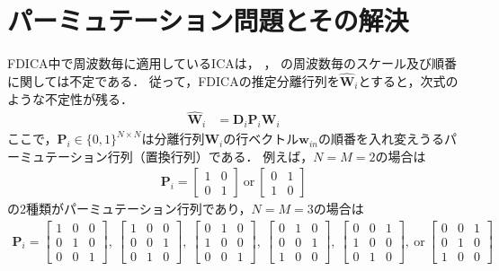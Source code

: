 \section{パーミュテーション問題とその解決}
\label{sec:pp}
FDICA中で周波数毎に適用しているICAは，
，
の周波数毎のスケール及び順番に関しては不定である．
従って，FDICAの推定分離行列を$\hat{\bm{W}}_i$とすると，次式のような不定性が残る．
\begin{align}
	\hat{\bm{W}}_{i} &= \bm{D}_{i}\bm{P}_{i}  \bm{W}_{i} \label{eq:w_fdica}
\end{align}
ここで，$\bm{P}_i \in \{0, 1\}^{N \times N}$は分離行列$\bm{W}_{i}$の行ベクトル$\bm{w}_{in}$の順番を入れ変えうるパーミュテーション行列（置換行列）である．
例えば，$N=M=2$の場合は
\begin{align}
    \bm{P}_i = 
    \begin{bmatrix}
        1 & 0 \\
        0 & 1
    \end{bmatrix}
    ~\mathrm{or}~
    \begin{bmatrix}
        0 & 1 \\
        1 & 0
    \end{bmatrix}
    \label{eq:permu_mat_2dim}
\end{align}
の2種類がパーミュテーション行列であり，$N=M=3$の場合は
\begin{align}
    \bm{P}_i = 
    \begin{bmatrix}
        1 & 0 & 0 \\
        0 & 1 & 0 \\
        0 & 0 & 1
    \end{bmatrix}
    ,~
    \begin{bmatrix}
        1 & 0 & 0 \\
        0 & 0 & 1 \\
        0 & 1 & 0
    \end{bmatrix}
    ,~
    \begin{bmatrix}
        0 & 1 & 0 \\
        1 & 0 & 0 \\
        0 & 0 & 1
    \end{bmatrix}
    ,~
    \begin{bmatrix}
        0 & 1 & 0 \\
        0 & 0 & 1 \\
        1 & 0 & 0
    \end{bmatrix}
    ,~
    \begin{bmatrix}
        0 & 0 & 1 \\
        1 & 0 & 0 \\
        0 & 1 & 0
    \end{bmatrix}
    ,~\mathrm{or}~
    \begin{bmatrix}
        0 & 0 & 1 \\
        0 & 1 & 0 \\
        1 & 0 & 0
    \end{bmatrix}
\end{align}
